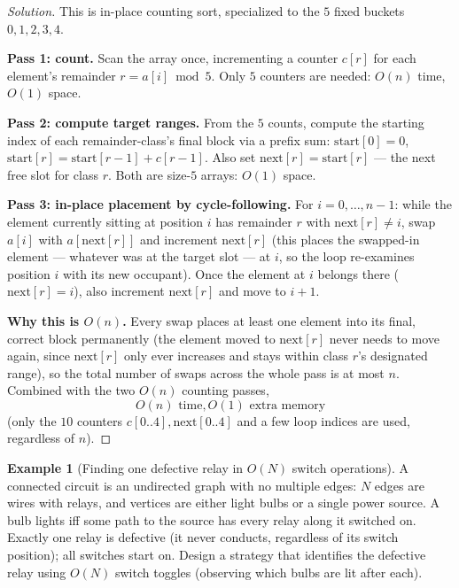 \documentclass[11pt]{article}
\theoremstyle{definition}
\newtheorem{example}{Example}[section]
\begin{document}
\begin{proof}[Solution]
This is in-place counting sort, specialized to the $5$ fixed buckets $0,1,2,3,4$.

\textbf{Pass 1: count.} Scan the array once, incrementing a counter $c[r]$ for each element's remainder $r=a[i]\bmod5$. Only $5$ counters are needed: $O(n)$ time, $O(1)$ space.

\textbf{Pass 2: compute target ranges.} From the $5$ counts, compute the starting index of each remainder-class's final block via a prefix sum: $\mathrm{start}[0]=0$, $\mathrm{start}[r]=\mathrm{start}[r-1]+c[r-1]$. Also set $\mathrm{next}[r]=\mathrm{start}[r]$ — the next free slot for class $r$. Both are size-$5$ arrays: $O(1)$ space.

\textbf{Pass 3: in-place placement by cycle-following.} For $i=0,\dots,n-1$: while the element currently sitting at position $i$ has remainder $r$ with $\mathrm{next}[r]\neq i$, swap $a[i]$ with $a[\mathrm{next}[r]]$ and increment $\mathrm{next}[r]$ (this places the swapped-in element — whatever was at the target slot — at $i$, so the loop re-examines position $i$ with its new occupant). Once the element at $i$ belongs there ($\mathrm{next}[r]=i$), also increment $\mathrm{next}[r]$ and move to $i+1$.

\textbf{Why this is $O(n)$.} Every swap places at least one element into its final, correct block permanently (the element moved to $\mathrm{next}[r]$ never needs to move again, since $\mathrm{next}[r]$ only ever increases and stays within class $r$'s designated range), so the total number of swaps across the whole pass is at most $n$. Combined with the two $O(n)$ counting passes,
\[
\boxed{O(n) \text{ time}, O(1) \text{ extra memory}}
\]
(only the $10$ counters $c[0..4],\mathrm{next}[0..4]$ and a few loop indices are used, regardless of $n$).
\end{proof}

\begin{example}[Finding one defective relay in $O(N)$ switch operations]
A connected circuit is an undirected graph with no multiple edges: $N$ edges are wires with relays, and vertices are either light bulbs or a single power source. A bulb lights iff some path to the source has every relay along it switched on. Exactly one relay is defective (it never conducts, regardless of its switch position); all switches start on. Design a strategy that identifies the defective relay using $O(N)$ switch toggles (observing which bulbs are lit after each).
\end{example}
\end{document}
